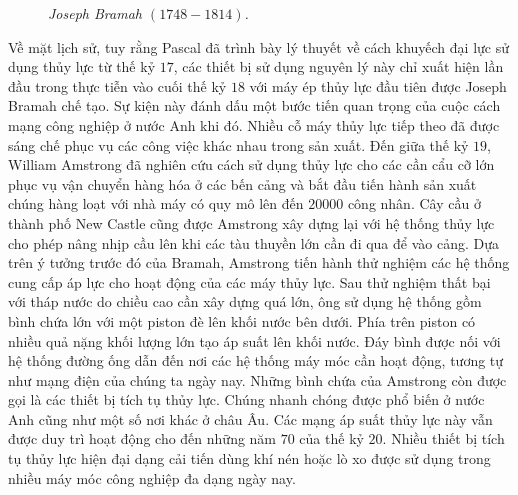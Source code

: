 \begin{multicols}{2}
\begin{figure}[H]
		\caption{\small\textit{\color{timhieukhoahoc}Joseph Bramah $(1748-1814)$.}}
		\vspace*{-10pt}
	\end{figure}
	Về mặt lịch sử, tuy rằng Pascal đã trình bày lý thuyết về cách khuyếch đại lực sử dụng thủy lực từ thế kỷ $17$, các thiết bị sử dụng nguyên lý này chỉ xuất hiện lần đầu trong thực tiễn vào cuối thế kỷ $18$ với  máy ép thủy lực đầu tiên được Joseph Bramah chế tạo. Sự kiện này đánh dấu một bước tiến quan trọng của cuộc cách mạng công nghiệp ở nước Anh khi đó. Nhiều cỗ máy thủy lực tiếp theo đã được sáng chế phục vụ các công việc khác nhau trong sản xuất. Đến giữa thế kỷ $19$, William Amstrong đã nghiên cứu cách sử dụng thủy lực cho các cần cẩu cỡ lớn phục vụ vận chuyển hàng hóa ở các bến cảng và bắt đầu tiến hành sản xuất chúng hàng loạt với nhà máy có quy mô lên đến $20000$ công nhân. Cây cầu ở thành phố New Castle cũng được Amstrong xây dựng lại với hệ thống thủy lực cho phép nâng nhịp cầu lên khi các tàu thuyền lớn cần đi qua để vào cảng.
	\vskip 0.1cm
	Dựa trên ý tưởng trước đó của Bramah, Amstrong tiến hành thử nghiệm các hệ thống cung cấp áp lực cho hoạt động của các máy thủy lực. Sau thử nghiệm thất bại với tháp nước do chiều cao cần xây dựng quá lớn, ông sử dụng hệ thống gồm bình chứa lớn với một piston đè lên khối nước bên dưới. Phía trên piston có nhiều quả nặng khối lượng lớn tạo áp suất lên khối nước. Đáy bình được nối với hệ thống đường ống dẫn đến nơi các hệ thống máy móc cần hoạt động, tương tự như mạng điện của chúng ta ngày nay. Những bình chứa của Amstrong còn được gọi là các thiết bị tích tụ thủy lực. Chúng nhanh chóng được phổ biến ở nước Anh cũng như một số nơi khác ở châu Âu. Các mạng áp suất thủy lực này vẫn được duy trì hoạt động cho đến những năm $70$ của thế kỷ $20$. Nhiều thiết bị tích tụ thủy lực hiện đại dạng cải tiến dùng khí nén hoặc lò xo được sử dụng trong nhiều máy móc công nghiệp đa dạng ngày nay.
	\begin{figure}[H]
		\vspace*{-5pt}
		\centering
		\captionsetup{labelformat= empty, justification=centering}

\end{figure}
\end{multicols}
